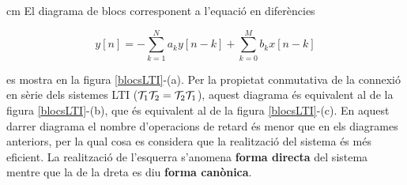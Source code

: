\documentclass{article}
\begin{document}
 cm
\noindent
El diagrama de blocs corresponent a l'equaci\'o en difer\`encies

\[
y[n]=-\sum_{k=1}^N a_k y[n-k] + \sum_{k=0}^M b_k x[n-k]
\]

\noindent
es mostra en la figura \ref{blocsLTI}-(a). Per la propietat 
conmutativa de la connexi\'o en s\`erie dels sistemes LTI
(${\cal T}_1 {\cal T}_2 = {\cal T}_2 {\cal T}_1$), aquest diagrama
\'es equivalent al de la figura \ref{blocsLTI}-(b), que
\'es equivalent al de la figura \ref{blocsLTI}-(c). En aquest 
darrer diagrama el nombre d'operacions de retard \'es menor que
en els diagrames anteriors, per la qual cosa es considera que
la realitzaci\'o del sistema \'es m\'es eficient. La realitzaci\'o de l'esquerra
s'anomena \textbf{forma directa} del sistema mentre que la de
la dreta es diu \textbf{forma can\`onica}.
\end{document}

